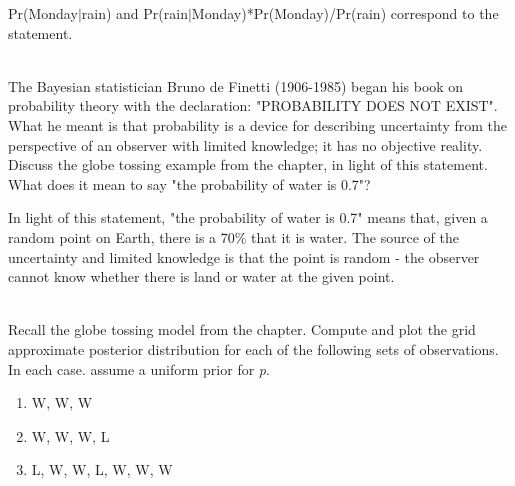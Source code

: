 \documentclass[12pt]{article}\usepackage[]{graphicx}\usepackage[]{color}
\newenvironment{problem}[2][Problem]{\begin{trivlist}
\item[\hskip \labelsep {\bfseries #1}\hskip \labelsep {\bfseries #2.}]}{\end{trivlist}}
\begin{document}
Pr(Monday$\vert$rain) and Pr(rain$\vert$Monday)*Pr(Monday)/Pr(rain) correspond to the statement.

\begin{problem}{2E4}
\text{}\\
The Bayesian statistician Bruno de Finetti (1906-1985) began his book on probability theory with the declaration: "PROBABILITY DOES NOT EXIST". What he meant is that probability is a device for describing uncertainty from the perspective of an observer with limited knowledge; it has no objective reality. Discuss the globe tossing example from the chapter, in light of this statement. What does it mean to say "the probability of water is 0.7"?
\end{problem}

In light of this statement, "the probability of water is 0.7" means that, given a random point on Earth, there is a 70\% that it is water. The source of the uncertainty and limited knowledge is that the point is random - the observer cannot know whether there is land or water at the given point.

\begin{problem}{2M1}
\text{}\\
Recall the globe tossing model from the chapter. Compute and plot the grid approximate posterior distribution for each of the following sets of observations. In each case. assume a uniform prior for \textit{p}.
\begin{enumerate}
\item W, W, W
\item W, W, W, L
\item L, W, W, L, W, W, W
\end{enumerate}
\end{problem}
\end{document}
